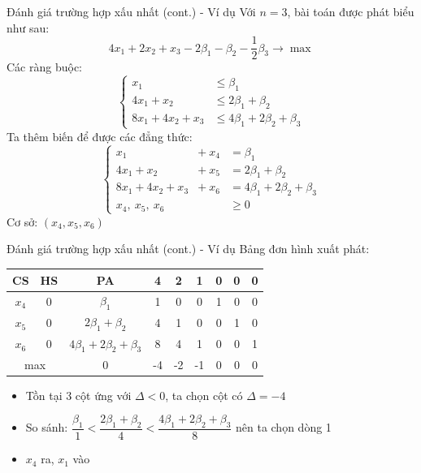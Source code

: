 \documentclass[10pt]{beamer}
\begin{document}
\begin{frame}{Đánh giá trường hợp xấu nhất (cont.) - Ví dụ}
Với $n = 3$, bài toán được phát biểu như sau:
$$
4x_1 + 2x_2 + x_3 - 2\beta_1 - \beta_2 - \frac{1}{2}\beta_3 \rightarrow \max
$$
Các ràng buộc:
$$
\left\{
\begin{array}{lll}
x_1 &\leq \beta_1\\
4x_1 + x_2 &\leq 2\beta_1 + \beta_2\\
8x_1 + 4x_2 + x_3 &\leq 4\beta_1 + 2\beta_2 + \beta_3
\end{array}
\right.
$$
Ta thêm biến để được các đẳng thức:
$$
\left\{
\begin{array}{lll}
x_1 & + \ x_4 & = \beta_1\\
4x_1 + x_2 & + \ x_5 & = 2\beta_1 + \beta_2\\
8x_1 + 4x_2 + x_3 & + \ x_6 & = 4\beta_1 + 2\beta_2 + \beta_3\\
x_4, \ x_5, \ x_6 & &\geq 0
\end{array}
\right.
$$
Cơ sở: $(x_4, x_5, x_6)$
\end{frame}

\begin{frame}{Đánh giá trường hợp xấu nhất (cont.) - Ví dụ}
Bảng đơn hình xuất phát:
\begin{table}[H]
\centering
\begin{tabular}{|c|c|c|c|c|c|c|c|c|}
\hline
CS & HS & PA & 4 & 2 & 1 & 0 & 0 & 0 \\
\hline
$x_4$ & 0 & $\beta_1$ & 1 & 0 & 0 & 1 & 0 & 0 \\
$x_5$ & 0 & $2\beta_1 + \beta_2$ & 4 & 1 & 0 & 0 & 1 & 0 \\
$x_6$ & 0 & $4\beta_1 + 2\beta_2 + \beta_3$ & 8 & 4 & 1 & 0 & 0 & 1 \\
\hline
\multicolumn{2}{|c|}{max}
& 0 & -4 & -2 & -1 & 0 & 0 & 0 \\
\hline
\end{tabular}
\end{table}
\begin{itemize}
\item Tồn tại 3 cột ứng với $\Delta < 0$, ta chọn cột có $\Delta = -4$  
\item So sánh: $\dfrac{\beta_1}{1} < \dfrac{2\beta_1 + \beta_2}{4} < \dfrac{4\beta_1 + 2\beta_2 + \beta_3}{8}$ nên ta chọn dòng 1  
\item $x_4$ ra, $x_1$ vào
\end{itemize}
\end{frame}
\end{document}
